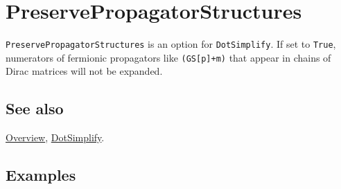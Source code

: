 \documentclass[../FeynCalcManual.tex]{subfiles}
\begin{document}
\hypertarget{preservepropagatorstructures}{
\section{PreservePropagatorStructures}\label{preservepropagatorstructures}}

\texttt{PreservePropagatorStructures} is an option for
\texttt{DotSimplify}. If set to \texttt{True}, numerators of fermionic
propagators like \texttt{(GS[\allowbreak{}p]+m)} that appear in chains
of Dirac matrices will not be expanded.

\subsection{See also}

\hyperlink{toc}{Overview}, \hyperlink{dotsimplify}{DotSimplify}.

\subsection{Examples}
\end{document}

